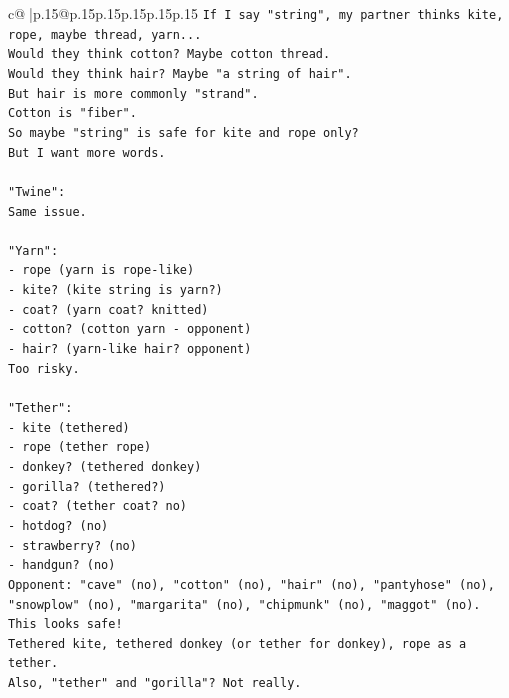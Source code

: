 \documentclass{article}
\begin{document}
{\begin{supertabular}{c@{$\;$}|p{.15\linewidth}@{}p{.15\linewidth}p{.15\linewidth}p{.15\linewidth}p{.15\linewidth}p{.15\linewidth}}
{{{\texttt{If I say "string", my partner thinks kite, rope, maybe thread, yarn...} \\
\texttt{Would they think cotton? Maybe cotton thread.} \\
\texttt{Would they think hair? Maybe "a string of hair".} \\
\texttt{But hair is more commonly "strand".} \\
\texttt{Cotton is "fiber".} \\
\texttt{So maybe "string" is safe for kite and rope only?} \\
\texttt{But I want more words.} \\
\\ 
\texttt{"Twine":} \\
\texttt{Same issue.} \\
\\ 
\texttt{"Yarn":} \\
\texttt{{-} rope (yarn is rope{-}like)} \\
\texttt{{-} kite? (kite string is yarn?)} \\
\texttt{{-} coat? (yarn coat? knitted)} \\
\texttt{{-} cotton? (cotton yarn {-} opponent)} \\
\texttt{{-} hair? (yarn{-}like hair? opponent)} \\
\texttt{Too risky.} \\
\\ 
\texttt{"Tether":} \\
\texttt{{-} kite (tethered)} \\
\texttt{{-} rope (tether rope)} \\
\texttt{{-} donkey? (tethered donkey)} \\
\texttt{{-} gorilla? (tethered?)} \\
\texttt{{-} coat? (tether coat? no)} \\
\texttt{{-} hotdog? (no)} \\
\texttt{{-} strawberry? (no)} \\
\texttt{{-} handgun? (no)} \\
\texttt{Opponent: "cave" (no), "cotton" (no), "hair" (no), "pantyhose" (no), "snowplow" (no), "margarita" (no), "chipmunk" (no), "maggot" (no).} \\
\texttt{This looks safe!} \\
\texttt{Tethered kite, tethered donkey (or tether for donkey), rope as a tether.} \\
\texttt{Also, "tether" and "gorilla"? Not really.} \\
}}}
\end{supertabular}}
\end{document}
